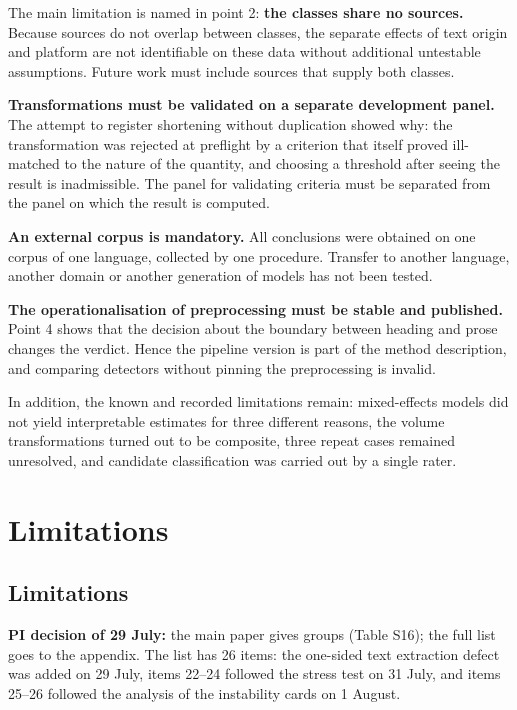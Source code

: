 \documentclass[11pt,a4paper]{article}
\renewcommand{\_}{\textunderscore\allowbreak}
\begin{document}
The main limitation is named in point 2: \textbf{the classes share no sources.}
Because sources do not overlap between classes, the separate effects of text
origin and platform are not identifiable on these data without additional
untestable assumptions. Future work must include sources that supply both
classes.

\textbf{Transformations must be validated on a separate development panel.} The
attempt to register shortening without duplication showed why: the transformation
was rejected at preflight by a criterion that itself proved ill-matched to the
nature of the quantity, and choosing a threshold after seeing the result is
inadmissible. The panel for validating criteria must be separated from the panel
on which the result is computed.

\textbf{An external corpus is mandatory.} All conclusions were obtained on one corpus
of one language, collected by one procedure. Transfer to another language,
another domain or another generation of models has not been tested.

\textbf{The operationalisation of preprocessing must be stable and published.} Point 4
shows that the decision about the boundary between heading and prose changes the
verdict. Hence the pipeline version is part of the method description, and
comparing detectors without pinning the preprocessing is invalid.

In addition, the known and recorded limitations remain: mixed-effects models did
not yield interpretable estimates for three different reasons, the volume
transformations turned out to be composite, three repeat cases remained
unresolved, and candidate classification was carried out by a single rater.

\section{Limitations}

\subsection{Limitations}

\textbf{PI decision of 29 July:} the main paper gives groups (Table S16); the full list goes to the appendix. The list has 26 items: the one-sided text extraction defect was added on 29 July, items 22–24 followed the stress test on 31 July, and items 25–26 followed the analysis of the instability cards on 1 August.
\end{document}
